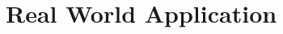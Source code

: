 \documentclass[10pt,journal,cspaper,compsoc]{IEEEtran}
\begin{document}





\section{Real World Application} %
\label{sec:simulated_experiment}
\end{document}
